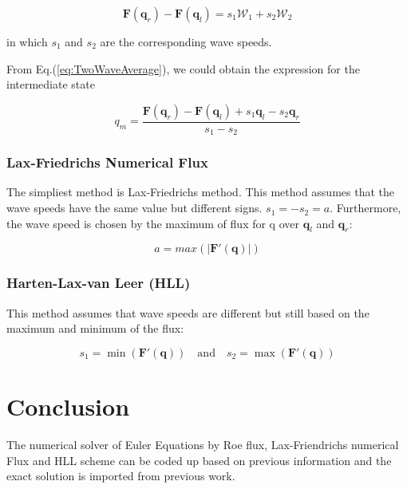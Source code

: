 \documentclass[11pt]{diazessay} %
\begin{document}
\begin{equation}\label{eq:TwoWaveAverage}
    \textbf{F}(\textbf{q}_r) - \textbf{F}(\textbf{q}_l) = s_1\mathcal{W}_1 + s_2\mathcal{W}_2
\end{equation}


in which $s_1$ and $s_2$ are the corresponding wave speeds.

From Eq.(\ref{eq:TwoWaveAverage}), we could obtain the expression for the intermediate state

\begin{equation}
    \label{eq:TwoWaveIntermediate}
    q_m = \frac{\textbf{F}(\textbf{q}_r)-\textbf{F}(\textbf{q}_l) + s_1\textbf{q}_l - s_2\textbf{q}_r}{s_1 - s_2}
\end{equation}




\subsubsection{Lax-Friedrichs Numerical Flux}

The simpliest method is Lax-Friedrichs method. This method assumes that the wave speeds have the same value but different signs. $s_1 = -s_2 = a$. Furthermore, the wave speed is chosen by the maximum of flux for q over $\textbf{q}_l$ and $\textbf{q}_r$:

\begin{equation}
    a =  max(|\textbf{F}'(\textbf{q})|)
\end{equation}

\subsubsection{Harten-Lax-van Leer (HLL)}

This method assumes that wave speeds are different but still based on the maximum and minimum of the flux:

\begin{equation}
    s_1 =  \min(\textbf{F}'(\textbf{q})) \quad \mbox{and}\quad s_2 =  \max(\textbf{F}'(\textbf{q}))
\end{equation}


\section{Conclusion}

The numerical solver of Euler Equations by Roe flux, Lax-Friendrichs numerical Flux and HLL scheme can be coded up based on previous information and the exact solution is imported from previous work\cite{david_i_ketcheson_chapter_2020}. 
\end{document}
